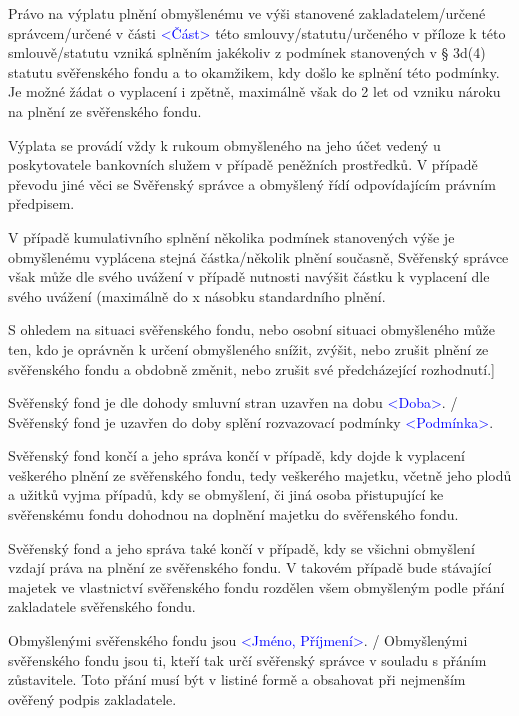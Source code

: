 \documentclass[parskip=half]{scrreprt}
\begin{document}
\begin{contract}
Právo na výplatu plnění obmyšlenému ve výši stanovené zakladatelem/určené správcem/určené v části \textcolor{blue}{<Část>} této smlouvy/statutu/určeného v příloze k této smlouvě/statutu vzniká splněním jakékoliv z podmínek stanovených v § 3d(4) statutu svěřenského fondu a to okamžikem, kdy došlo ke splnění této podmínky. Je možné žádat o vyplacení i zpětně, maximálně však do 2 let od vzniku nároku na plnění ze svěřenského fondu.

Výplata se provádí vždy k rukoum obmyšleného na jeho účet vedený u poskytovatele bankovních služem v případě peněžních prostředků. V případě převodu jiné věci se Svěřenský správce a obmyšlený řídí odpovídajícím právním předpisem.

V případě kumulativního splnění několika podmínek stanovených výše je obmyšlenému vyplácena stejná částka/několik plnění současně, Svěřenský správce však může dle svého uvážení v případě nutnosti navýšit částku k vyplacení dle svého uvážení (maximálně do x násobku standardního plnění.

S ohledem na situaci svěřenského fondu, nebo osobní situaci obmyšleného může ten, kdo je oprávněn k určení obmyšleného snížit, zvýšit, nebo zrušit plnění ze svěřenského fondu a obdobně změnit, nebo zrušit své předcházející rozhodnutí.]
\parnumbertrue


Svěřenský fond je dle dohody smluvní stran uzavřen na dobu \textcolor{blue}{<Doba>}. / Svěřenský fond je uzavřen do doby splění rozvazovací podmínky \textcolor{blue}{<Podmínka>}.

Svěřenský fond končí a jeho správa končí v případě, kdy dojde k vyplacení veškerého plnění ze svěřenského fondu, tedy veškerého majetku, včetně jeho plodů a užitků vyjma případů, kdy se obmyšlení, či jiná osoba přistupující ke svěřenskému fondu dohodnou na doplnění majetku do svěřenského fondu.

Svěřenský fond a jeho správa také končí v případě, kdy se všichni obmyšlení vzdají práva na plnění ze svěřenského fondu. V takovém případě bude stávající majetek ve vlastnictví svěřenského fondu rozdělen všem obmyšleným podle přání zakladatele svěřenského fondu.



Obmyšlenými svěřenského fondu jsou \textcolor{blue}{<Jméno, Příjmení>}. / Obmyšlenými svěřenského fondu jsou ti, kteří tak určí svěřenský správce v souladu s přáním zůstavitele. Toto přání musí být v listiné formě a obsahovat při nejmenším ověřený podpis zakladatele.


\end{contract}
\end{document}
